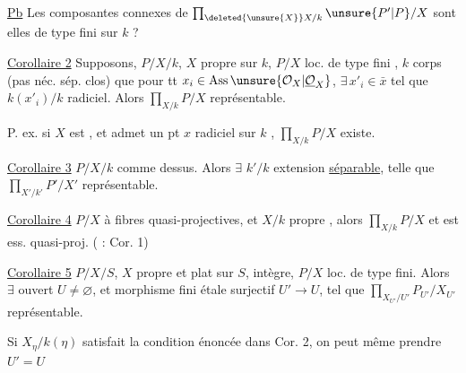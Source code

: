 \uline{Pb} Les composantes connexes de $\prod_{\deleted{\unsure{X}}X/k}\unsure{P'|P}/X$ sont elles de type fini sur $k$ ?

\uline{Corollaire 2} Supposons,  $P/X/k$, $X$ propre sur $k$, $P/X$ loc. de type fini , $k$ corps (pas néc. sép. clos) que  pour tt $x_i\in\operatorname{Ass}\unsure{\mathcal O_X|\underline{\mathcal O}_X}$, $\exists\,x'_i\in\bar x$ tel que $k(x'_i)/k$ radiciel.  Alors $\prod_{X/k}P/X$ représentable.




P. ex. si $X$  est ,  et admet un pt $x$ radiciel sur $k$ , $\prod_{X/k}P/X$ existe.

\uline{Corollaire 3} $P/X/k$ comme dessus. Alors $\exists$ $k'/k$ extension  \uline{séparable}, telle que $\prod_{X'/k'}P'/X'$ représentable.



\uline{Corollaire 4}  $P/X$ à fibres quasi-projectives, et $X/k$ propre , alors $\prod_{X/k}P/X$  et est ess. quasi-proj. ( : Cor. 1)

\uline{Corollaire 5} $P/X/S$, $X$ propre et plat sur $S$,  intègre, $P/X$ loc. de type fini. Alors $\exists$  ouvert $U\ne\varnothing$, et morphisme fini étale surjectif $U'\to U$, tel que $\prod_{X_{U'}/U'}P_{U'}/X_{U'}$ représentable.



Si $X_\eta/k(\eta)$ satisfait la condition énoncée dans Cor. 2, on peut même prendre $U'=U$

